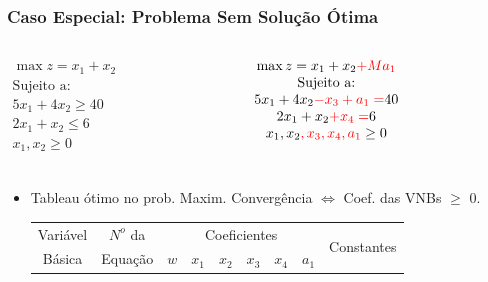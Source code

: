 \documentclass{beamer}
\begin{document}
\begin{frame}
	\frametitle{Caso Especial: Problema Sem Solução Ótima}
	\begin{columns}
		\centering
		\begin{column}{5cm}
			\begin{mdframed}[backgroundcolor=black!20]
				\centering
				\scriptsize
				$	\begin{matrix}
						\max z = x_1 + x_2\\
						\text{Sujeito a:} \\
						5x_1 + 4x_2 \ge 40 \\
						2x_1 + x_2 \le 6 \\
						x_1, x_2 \ge 0 \\
					\end{matrix}
				$			
			\end{mdframed}
		\end{column}
		\begin{column}{5cm}
			\begin{mdframed}[backgroundcolor=yellow!70]
				\centering
				\scriptsize
				$	\begin{matrix}
						\max z = x_1 + x_2 {\color{red}+Ma_1}\\
						\text{Sujeito a:} \\
						5x_1 + 4x_2 {\color{red} - x_3 + a_1 =} 40 \\
						2x_1 + x_2 {\color{red} + x_4 =} 6 \\
						x_1, x_2{\color{red} ,x_3,x_4,a_1} \ge 0 \\
					\end{matrix}
				$			
			\end{mdframed}
		\end{column}
	\end{columns}
	\begin{itemize}
		\item {Tableau ótimo no prob. Maxim. Convergência $\Leftrightarrow$ Coef. das VNBs $\ge$ 0.}
		\begin{table}
			\scriptsize
			\newcommand{\azbr}{\cellcolor{blue!70} \color{white}}
			\newcommand{\azvm}{\cellcolor{blue!70} \color{red}}
			\newcommand{\ampr}{\cellcolor{yellow!70} \color{black}}
			\newcommand{\amvm}{\cellcolor{yellow!70} \color{red}}
			\begin{tabular}{ c  c  c  c  c  c  c  c c }
			\azbr Variável & \azbr $N^o$ da & \multicolumn{6}{c}{\azbr Coeficientes} & \multirow{2}{1.5cm}{\azbr  Constantes} \\[3pt]
			\azbr Básica   & \azbr Equação  & \azbr $w$ & \azbr  $x_1$ & \azvm $x_2$ & \azbr $x_3$ & \azbr $x_4$ & \azvm $a_1$ & \azbr          \\[3pt]

\end{tabular}
\end{table}
\end{itemize}
\end{frame}
\end{document}
